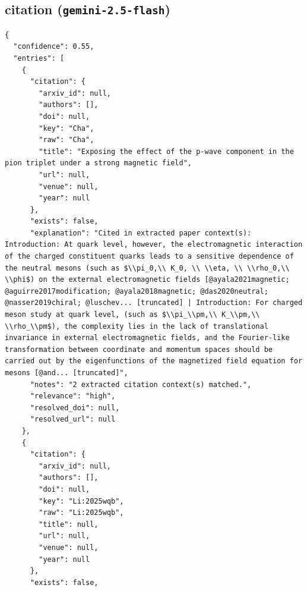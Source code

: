 \documentclass[11pt]{article}
\begin{document}
\subsection*{citation (\texttt{gemini-2.5-flash})}
\begin{verbatim}
{
  "confidence": 0.55,
  "entries": [
    {
      "citation": {
        "arxiv_id": null,
        "authors": [],
        "doi": null,
        "key": "Cha",
        "raw": "Cha",
        "title": "Exposing the effect of the p-wave component in the pion triplet under a strong magnetic field",
        "url": null,
        "venue": null,
        "year": null
      },
      "exists": false,
      "explanation": "Cited in extracted paper context(s): Introduction: At quark level, however, the electromagnetic interaction of the charged constituent quarks leads to a sensitive dependence of the neutral mesons (such as $\\pi_0,\\ K_0, \\ \\eta, \\ \\rho_0,\\ \\phi$) on the external electromagnetic fields [@ayala2021magnetic; @aguirre2017modification; @ayala2018magnetic; @das2020neutral; @nasser2019chiral; @luschev... [truncated] | Introduction: For charged meson study at quark level, (such as $\\pi_\\pm,\\ K_\\pm,\\ \\rho_\\pm$), the complexity lies in the lack of translational invariance in external electromagnetic fields, and the Fourier-like transformation between coordinate and momentum spaces should be carried out by the eigenfunctions of the magnetized field equation for mesons [@and... [truncated]",
      "notes": "2 extracted citation context(s) matched.",
      "relevance": "high",
      "resolved_doi": null,
      "resolved_url": null
    },
    {
      "citation": {
        "arxiv_id": null,
        "authors": [],
        "doi": null,
        "key": "Li:2025wqb",
        "raw": "Li:2025wqb",
        "title": null,
        "url": null,
        "venue": null,
        "year": null
      },
      "exists": false,

\end{verbatim}
\end{document}
